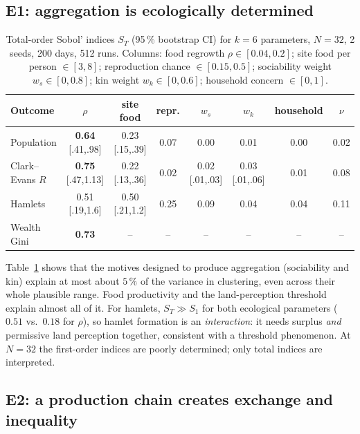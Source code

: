 \documentclass[11pt]{article}
\theoremstyle{definition}
\newcommand{\1}{\mathbf{1}}
\begin{document}
\subsection{E1: aggregation is ecologically determined}\label{sec:e1}

\begin{table}[h]
\centering\small
\caption{Total-order Sobol' indices $S_T$ (95\,\% bootstrap CI) for $k=6$ parameters, $N=32$, 2 seeds, 200 days, 512 runs. Columns: food regrowth $\rho\in[0.04,0.2]$; site food per person $\in[3,8]$; reproduction chance $\in[0.15,0.5]$; sociability weight $w_s\in[0,0.8]$; kin weight $w_k\in[0,0.6]$; household concern $\in[0,1]$.}
\label{tab:sobol}
\begin{tabular}{lccccccc}
\toprule
Outcome & $\rho$ & site food & repr. & $w_s$ & $w_k$ & household & $\nu$\\
\midrule
Population & \textbf{0.64} {\scriptsize[.41,.98]} & 0.23 {\scriptsize[.15,.39]} & 0.07 & 0.00 & 0.01 & 0.00 & 0.02\\
Clark--Evans $R$ & \textbf{0.75} {\scriptsize[.47,1.13]} & 0.22 {\scriptsize[.13,.36]} & 0.02 & 0.02 {\scriptsize[.01,.03]} & 0.03 {\scriptsize[.01,.06]} & 0.01 & 0.08\\
Hamlets & 0.51 {\scriptsize[.19,1.6]} & 0.50 {\scriptsize[.21,1.2]} & 0.25 & 0.09 & 0.04 & 0.04 & 0.11\\
Wealth Gini & \textbf{0.73} & -- & -- & -- & -- & -- & --\\
\bottomrule
\end{tabular}
\end{table}

Table~\ref{tab:sobol} shows that the motives designed to produce aggregation (sociability and kin) explain at most about $5\,\%$ of the variance in clustering, even across their whole plausible range. Food productivity and the land-perception threshold explain almost all of it. For hamlets, $S_T \gg S_1$ for both ecological parameters ($0.51$ vs.\ $0.18$ for $\rho$), so hamlet formation is an \emph{interaction}: it needs surplus \emph{and} permissive land perception together, consistent with a threshold phenomenon. At $N=32$ the first-order indices are poorly determined; only total indices are interpreted.

\subsection{E2: a production chain creates exchange and inequality}
\end{document}
